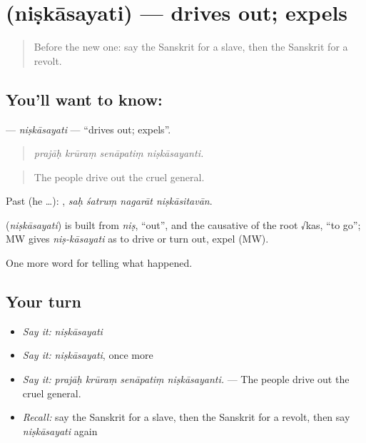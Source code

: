 \section[\texorpdfstring{\sk{निष्कासयति} (niṣkāsayati)}{निष्कासयति (niṣkāsayati)}]{ (niṣkāsayati) — drives out; expels}

\label{lesson:SA-C320-niskasayati}



\begin{quote}
Before the new one: say the Sanskrit for a slave, then the Sanskrit for a revolt.
\end{quote}

\subsection*{You'll want to know: }
\textbf{} — \emph{niṣkāsayati} — \textquotedblleft{}drives out; expels\textquotedblright{}.

\begin{quote}
   
\end{quote}

\begin{quote}
\emph{prajāḥ krūraṃ senāpatiṃ niṣkāsayanti.}
\end{quote}

\begin{quote}
The people drive out the cruel general.
\end{quote}

Past (he …):    , \emph{saḥ śatruṃ nagarāt niṣkāsitavān}.

\begin{cousinweb}
\textbf{} (\emph{niṣkāsayati}) is built from \emph{niṣ}, \textquotedblleft{}out\textquotedblright{}, and the causative of the root √kas, \textquotedblleft{}to go\textquotedblright{}; MW gives \emph{niṣ-kāsayati} as to drive or turn out, expel (MW).
\end{cousinweb}

\begin{grammarlens}[title={What you've built}]
One more word for telling what happened.
\end{grammarlens}

\subsection*{Your turn}
\begin{itemize}
\raggedright
  \item \emph{Say it:} \emph{niṣkāsayati}
  \item \emph{Say it:} \emph{niṣkāsayati}, once more
  \item \emph{Say it:} \emph{prajāḥ krūraṃ senāpatiṃ niṣkāsayanti.} — The people drive out the cruel general.
  \item \emph{Recall:} say the Sanskrit for a slave, then the Sanskrit for a revolt, then say \emph{niṣkāsayati} again
\end{itemize}

